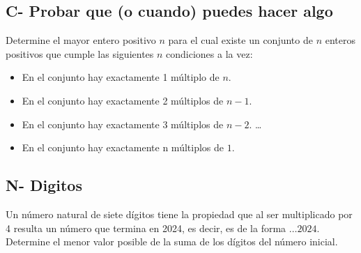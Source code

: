 \documentclass[11pt]{scrartcl}
\begin{document}
\subsection{C- Probar que (o cuando) puedes hacer algo}
\begin{problem} [2024 N1/4 ]
Determine el mayor entero positivo $n$ para el cual existe un conjunto de $n$ enteros positivos que cumple las siguientes $n$ condiciones a la vez: 
\begin{itemize}
\item En el conjunto hay exactamente 1 m\'ultiplo de $n$.
\item En el conjunto hay exactamente 2 m\'ultiplos de $n-1$.
\item En el conjunto hay exactamente 3 m\'ultiplos de $n-2$.
\ldots
\item En el conjunto hay exactamente n m\'ultiplos de $1$.
\end{itemize}
\end{problem}


\subsection{N- Digitos}

\begin{problem} [2024 N1/3]
Un n\'umero natural de siete d\'igitos tiene la propiedad que al ser multiplicado por 4 resulta
un n\'umero que termina en 2024, es decir, es de la forma  $\ldots 2024$. Determine el menor valor
posible de la suma de los d\'igitos del n\'umero inicial.
\end{problem}
\end{document}
